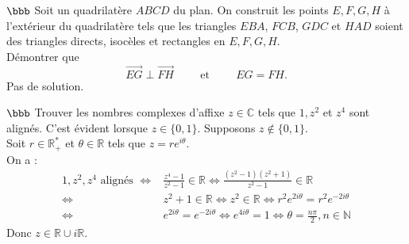 \documentclass[11pt]{article}
\begin{document}
\begin{exercice}{$\bbb$}{}
    Soit un quadrilatère $ABCD$ du plan. On construit les points $E, F, G, H$ à l'extérieur du quadrilatère tels que les triangles $EBA$, $FCB$, $GDC$ et $HAD$ soient des triangles directs, isocèles et rectangles en $E, F, G, H$.\\
    Démontrer que
    \begin{equation*}
        \overrightarrow{EG} \perp \overrightarrow{FH} \hspace{1cm} \text{et} \hspace{1cm} EG = FH.
    \end{equation*}
    \tcblower
    Pas de solution.
\end{exercice}

\begin{exercice}{$\bbb$}{}
    Trouver les nombres complexes d'affixe $z\in\mathbb{C}$ tels que $1,z^2$ et $z^4$ sont alignés.
    \tcblower
    C'est évident lorsque $z\in\{0,1\}$. Supposons $z\notin\{0,1\}$.\\
    Soit $r\in\mathbb{R_+^*}$ et $\theta\in\mathbb{R}$ tels que $z=re^{i\theta}$.\\ 
    On a :
    \begin{align*}
        1, z^2, z^4 \text{ alignés } \iff&\frac{z^4-1}{z^2-1} \in \mathbb{R} \iff\frac{(z^2-1)(z^2+1)}{z^2-1}\in\mathbb{R}\\
        \iff&z^2+1 \in \mathbb{R} \iff z^2 \in \mathbb{R} \iff r^2e^{2i\theta} = r^2e^{-2i\theta}\\
        \iff&e^{2i\theta} = e^{-2i\theta} \iff e^{4i\theta}=1 \iff\theta=\frac{n\pi}{2}, n\in\mathbb{N}
    \end{align*}
    Donc $z\in\mathbb{R}\cup i\mathbb{R}$.
\end{exercice}
\end{document}
